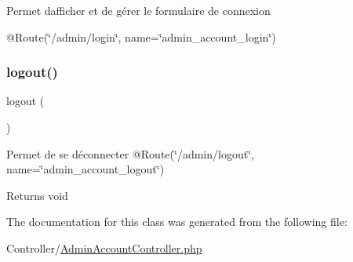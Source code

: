 Permet d\textquotesingle{}afficher et de gérer le formulaire de connexion

@\+Route(\char`\"{}/admin/login\char`\"{}, name=\char`\"{}admin\+\_\+account\+\_\+login\char`\"{}) \mbox{\label{class_app_1_1_controller_1_1_admin_account_controller_a082405d89acd6835c3a7c7a08a7adbab}} 
\subsubsection{\texorpdfstring{logout()}{logout()}}
{\footnotesize\ttfamily logout (\begin{DoxyParamCaption}{ }\end{DoxyParamCaption})}

Permet de se déconnecter @\+Route(\char`\"{}/admin/logout\char`\"{}, name=\char`\"{}admin\+\_\+account\+\_\+logout\char`\"{})

\begin{DoxyReturn}{Returns}
void 
\end{DoxyReturn}


The documentation for this class was generated from the following file\+:\begin{DoxyCompactItemize}
\item 
Controller/\mbox{\hyperlink{_admin_account_controller_8php}{Admin\+Account\+Controller.\+php}}\end{DoxyCompactItemize}
